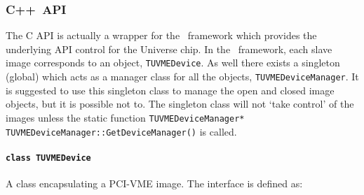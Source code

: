 			\subsubsection{C++~API}
The C API is actually a wrapper for the \cpp~framework which provides the underlying
API control for the Universe chip.
In the \cpp~framework, each slave image corresponds to an object, \lstinline!TUVMEDevice!.  As well there
exists a singleton (global) which acts as a manager class for all the objects, \lstinline!TUVMEDeviceManager!.
It is suggested to use this singleton class to manage the open and closed image objects, but it is possible
not to.  The singleton class will not `take control' of the images unless the static function 
\lstinline!TUVMEDeviceManager* TUVMEDeviceManager::GetDeviceManager()! is called.  

				\paragraph{\lstinline!class TUVMEDevice!}
A class encapsulating a PCI-VME image.  The interface is defined as:
